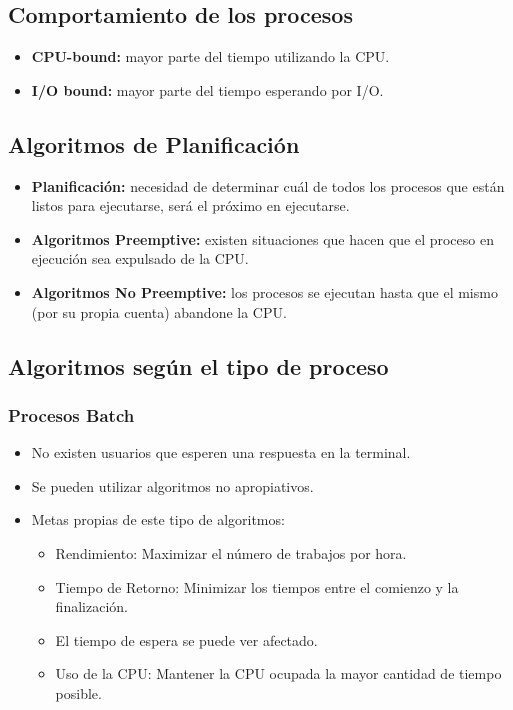 \subsection{Comportamiento de los procesos}
\begin{itemize}
    \item \textbf{CPU-bound:} mayor parte del tiempo utilizando la CPU.
    \item \textbf{I/O bound:} mayor parte del tiempo esperando por I/O.
\end{itemize}

\subsection{Algoritmos de Planificación}
\begin{itemize}
    \item \textbf{Planificación:} necesidad de determinar cuál de todos los procesos que están listos para ejecutarse, será el próximo en ejecutarse.
    \item \textbf{Algoritmos Preemptive:} existen situaciones que hacen que el proceso en ejecución sea expulsado de la CPU.
    \item \textbf{Algoritmos No Preemptive:} los procesos se ejecutan hasta que el mismo (por su propia cuenta) abandone la CPU.
\end{itemize}

\subsection{Algoritmos según el tipo de proceso}
\subsubsection{Procesos Batch}
\begin{itemize}
    \item No existen usuarios que esperen una respuesta en la terminal.
    \item Se pueden utilizar algoritmos no apropiativos.
    \item Metas propias de este tipo de algoritmos:
        \begin{itemize}
            \item Rendimiento: Maximizar el número de trabajos por hora.
            \item Tiempo de Retorno: Minimizar los tiempos entre el comienzo y la finalización.
            \item El tiempo de espera se puede ver afectado.
            \item Uso de la CPU: Mantener la CPU ocupada la mayor cantidad de tiempo posible.
        \end{itemize}
\end{itemize}

